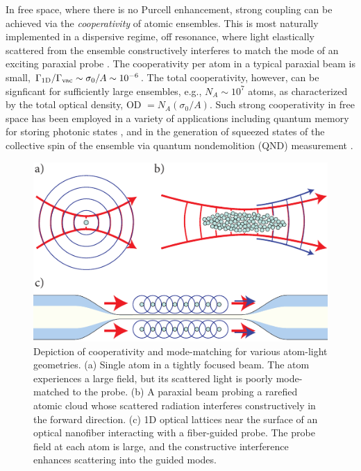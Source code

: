 \documentclass[aps,pra,twocolumn]{revtex4-1} %
\newcommand{\oneD}{{\rm 1D}}
\newcommand{\vac}{{\rm vac}}
\begin{document}
In free space, where there is no Purcell enhancement, strong coupling can be achieved via the {\em cooperativity} of atomic ensembles.  
This is most naturally implemented in a dispersive regime, off resonance, where light elastically scattered from the ensemble constructively interferes to match the mode of an exciting paraxial probe \cite{baragiola_three-dimensional_2014}.  
The cooperativity per atom in a typical paraxial beam is small, $\Gamma_{\oneD}/\Gamma_{\vac} \sim \sigma_0/A  \sim 10^{-6}$.  
The total cooperativity, however, can be signficant for sufficiently large ensembles, e.g., $N_A \sim  10^7$ atoms, as characterized by the total optical density, OD $= N_A (\sigma_0/A)$.  
Such strong cooperativity in free space has been employed in a variety of applications including quantum memory for storing photonic states \cite{chaneliere_storage_2005}, and in the generation of squeezed states of the collective spin of the ensemble via quantum nondemolition (QND) measurement \cite{kuzmich_generation_2000, appel_mesoscopic_2009, takano_spin_2009, sewell_magnetic_2012}.   

\begin{figure}
\includegraphics[scale=0.80]{./Figs/Fig_ModeMatch}
\caption{Depiction of cooperativity and mode-matching for various atom-light geometries. (a) Single atom in a tightly focused beam. The atom experiences a large field, but its scattered light is poorly mode-matched to the probe. (b) A paraxial beam probing a rarefied atomic cloud whose scattered radiation interferes constructively in the forward direction. (c) 1D optical lattices near the surface of an optical nanofiber interacting with a fiber-guided probe. The probe field at each atom is large, and the constructive interference enhances scattering into the guided modes.}\label{Fig::ModeMatching}
\end{figure}
\end{document}
